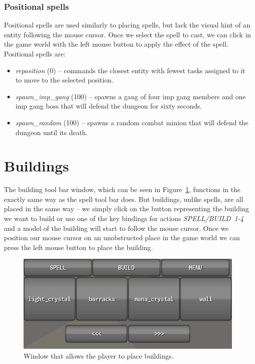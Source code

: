 \subsubsection{Positional spells}

Positional spells are used similarly to placing spells, but lack the visual hint of an entity following the mouse cursor. Once we select
the spell to cast, we can click in the game world with the left mouse button to apply the effect of the spell. Positional spells are:

\begin{itemize}
    \item \emph{reposition} (0) -- commands the closest entity with fewest tasks assigned to it to move to the selected position.
    \item \emph{spawn\_imp\_gang} (100) -- spawns a gang of four imp gang members and one imp gang boss that will defend the dungeon
        for sixty seconds.
    \item \emph{spawn\_random} (100) -- spawns a random combat minion that will defend the dungeon until its death.
\end{itemize}

\section{Buildings}

The building tool bar window, which can be seen in Figure~\ref{gui-build}, functions in the exactly same way as the spell tool bar does.
But buildings, unlike spells, are all placed in the same way -- we simply click on the button representing the building we want to build
or use one of the key bindings for actions \emph{SPELL/BUILD}~\mbox{\emph{1-4}} and a model of the building will start to follow the mouse
cursor.
Once we position our mouse cursor on an unobstructed place in the game world we can press the left mouse button to place the building.

\begin{figure}[H]
    \centering
    \includegraphics[width=\textwidth]{../img/tool-build.png}
    \caption{Window that allows the player to place buildings.}
    \label{gui-build}
\end{figure}

